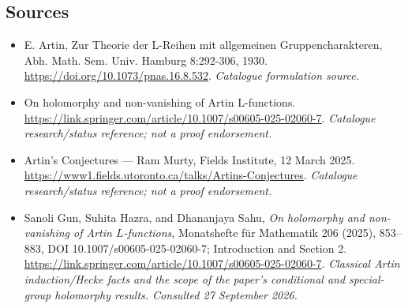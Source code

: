 \documentclass[11pt,a4paper]{article}
\numberwithin{equation}{section}
\begin{document}
\subsection{Sources}
\begin{itemize}\raggedright
\item[\textnormal{[S1]}]\hypertarget{source:30006705:1}{} E. Artin, Zur Theorie der L-Reihen mit allgemeinen Gruppencharakteren, Abh. Math. Sem. Univ. Hamburg 8:292-306, 1930.
\url{https://doi.org/10.1073/pnas.16.8.532}.
{\small\textit{Catalogue formulation source.}}
\item[\textnormal{[S2]}]\hypertarget{source:30006705:2}{} On holomorphy and non-vanishing of Artin L-functions.
\url{https://link.springer.com/article/10.1007/s00605-025-02060-7}.
{\small\textit{Catalogue research/status reference; not a proof endorsement.}}
\item[\textnormal{[S3]}]\hypertarget{source:30006705:3}{} Artin's Conjectures — Ram Murty, Fields Institute, 12 March 2025.
\url{https://www1.fields.utoronto.ca/talks/Artins-Conjectures}.
{\small\textit{Catalogue research/status reference; not a proof endorsement.}}

\item[\textnormal{[E1]}]\hypertarget{extra:30006705:1}{} Sanoli Gun, Suhita Hazra, and Dhananjaya Sahu, \emph{On holomorphy and non-vanishing of Artin $L$-functions}, Monatshefte für Mathematik 206 (2025), 853--883, DOI 10.1007/s00605-025-02060-7; Introduction and Section 2.
\url{https://link.springer.com/article/10.1007/s00605-025-02060-7}.
{\small\textit{Classical Artin induction/Hecke facts and the scope of the paper's conditional and special-group holomorphy results. Consulted 27 September 2026.}}
\end{itemize}
\end{document}
